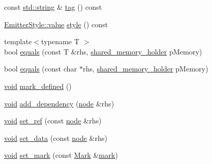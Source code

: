 \begin{DoxyCompactItemize}
\item 
const \mbox{\hyperlink{glad_8h_ac83513893df92266f79a515488701770}{std\+::string}} \& \mbox{\hyperlink{class_y_a_m_l_1_1detail_1_1node_af3835475a5b5c9bd8082c78ec61d9030}{tag}} () const
\item 
\mbox{\hyperlink{struct_y_a_m_l_1_1_emitter_style_ae86640662c85ce6062a37f9636b6959f}{Emitter\+Style\+::value}} \mbox{\hyperlink{class_y_a_m_l_1_1detail_1_1node_a66bd0395a746cbcb3607e441dd8726ff}{style}} () const
\item 
{\footnotesize template$<$typename T $>$ }\\bool \mbox{\hyperlink{class_y_a_m_l_1_1detail_1_1node_ac267a4fe42e731110d01e2b8b699baee}{equals}} (const T \&rhs, \mbox{\hyperlink{namespace_y_a_m_l_1_1detail_a228c4b3b6ba1058b474d40afc218e21d}{shared\+\_\+memory\+\_\+holder}} p\+Memory)
\item 
bool \mbox{\hyperlink{class_y_a_m_l_1_1detail_1_1node_ab37848e6a257a7df5d36d5e078cc3516}{equals}} (const char $\ast$rhs, \mbox{\hyperlink{namespace_y_a_m_l_1_1detail_a228c4b3b6ba1058b474d40afc218e21d}{shared\+\_\+memory\+\_\+holder}} p\+Memory)
\item 
\mbox{\hyperlink{glad_8h_a950fc91edb4504f62f1c577bf4727c29}{void}} \mbox{\hyperlink{class_y_a_m_l_1_1detail_1_1node_aaa0b5d4004dab426deedc9a06b2d25f6}{mark\+\_\+defined}} ()
\item 
\mbox{\hyperlink{glad_8h_a950fc91edb4504f62f1c577bf4727c29}{void}} \mbox{\hyperlink{class_y_a_m_l_1_1detail_1_1node_a8308e7b5e348fdf28222da904cba6738}{add\+\_\+dependency}} (\mbox{\hyperlink{class_y_a_m_l_1_1detail_1_1node}{node}} \&rhs)
\item 
\mbox{\hyperlink{glad_8h_a950fc91edb4504f62f1c577bf4727c29}{void}} \mbox{\hyperlink{class_y_a_m_l_1_1detail_1_1node_af18f7978073e65e45fa9cb094ae1b882}{set\+\_\+ref}} (const \mbox{\hyperlink{class_y_a_m_l_1_1detail_1_1node}{node}} \&rhs)
\item 
\mbox{\hyperlink{glad_8h_a950fc91edb4504f62f1c577bf4727c29}{void}} \mbox{\hyperlink{class_y_a_m_l_1_1detail_1_1node_a4689eaba86e9190e8e7313a73ca42c1c}{set\+\_\+data}} (const \mbox{\hyperlink{class_y_a_m_l_1_1detail_1_1node}{node}} \&rhs)
\item 
\mbox{\hyperlink{glad_8h_a950fc91edb4504f62f1c577bf4727c29}{void}} \mbox{\hyperlink{class_y_a_m_l_1_1detail_1_1node_aeba01fd4c8c0ccde7a21926c716ee333}{set\+\_\+mark}} (const \mbox{\hyperlink{struct_y_a_m_l_1_1_mark}{Mark}} \&\mbox{\hyperlink{class_y_a_m_l_1_1detail_1_1node_a169bedca09bd0ee2b5b5a867f04ce4a0}{mark}})
\item 

\end{DoxyCompactItemize}
